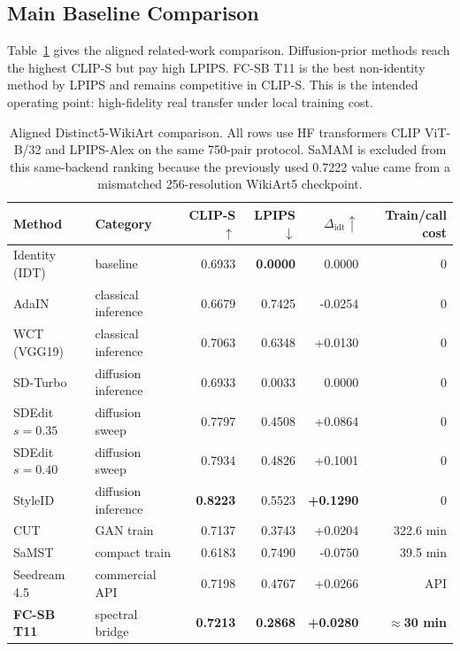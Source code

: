 \documentclass[letterpaper]{article}
\begin{document}
\subsection{Main Baseline Comparison}
Table~\ref{tab:related72} gives the aligned related-work comparison. Diffusion-prior methods reach the highest CLIP-S but pay high LPIPS. FC-SB T11 is the best non-identity method by LPIPS and remains competitive in CLIP-S. This is the intended operating point: high-fidelity real transfer under local training cost.

\begin{table}[t]
\centering
\small
\setlength{\tabcolsep}{4.5pt}
\caption{Aligned Distinct5-WikiArt comparison. All rows use HF transformers CLIP ViT-B/32 and LPIPS-Alex on the same 750-pair protocol. SaMAM is excluded from this same-backend ranking because the previously used 0.7222 value came from a mismatched 256-resolution WikiArt5 checkpoint.}
\label{tab:related72}
\begin{tabular}{@{}llrrrr@{}}
\toprule
Method & Category & CLIP-S$\uparrow$ & LPIPS$\downarrow$ & $\Delta_{\mathrm{idt}}\uparrow$ & Train/call cost \\
\midrule
Identity (IDT) & baseline & 0.6933 & \textbf{0.0000} & 0.0000 & 0 \\
AdaIN & classical inference & 0.6679 & 0.7425 & -0.0254 & 0 \\
WCT (VGG19) & classical inference & 0.7063 & 0.6348 & +0.0130 & 0 \\
SD-Turbo & diffusion inference & 0.6933 & 0.0033 & 0.0000 & 0 \\
SDEdit $s=0.35$ & diffusion sweep & 0.7797 & 0.4508 & +0.0864 & 0 \\
SDEdit $s=0.40$ & diffusion sweep & 0.7934 & 0.4826 & +0.1001 & 0 \\
StyleID & diffusion inference & \textbf{0.8223} & 0.5523 & \textbf{+0.1290} & 0 \\
CUT & GAN train & 0.7137 & 0.3743 & +0.0204 & 322.6 min \\
SaMST & compact train & 0.6183 & 0.7490 & -0.0750 & 39.5 min \\
Seedream 4.5 & commercial API & 0.7198 & 0.4767 & +0.0266 & API \\
\textbf{FC-SB T11} & spectral bridge & \textbf{0.7213} & \textbf{0.2868} & \textbf{+0.0280} & \textbf{$\approx$30 min} \\
\bottomrule
\end{tabular}
\end{table}
\end{document}
